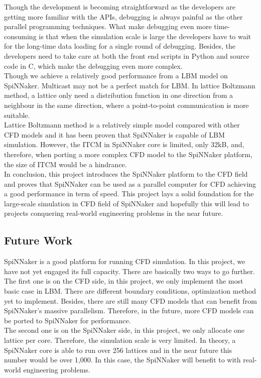 Though the development is becoming straightforward as the developers are getting more familiar with the APIs, debugging is always painful as the other parallel programming techniques. What make debugging even more time-consuming is that when the simulation scale is large the developers have to wait for the long-time data loading for a single round of debugging. Besides, the developers need to take care at both the front end scripts in Python and source code in C, which make the debugging even more complex. \\

Though we achieve a relatively good performance from a LBM model on SpiNNaker. Multicast may not be a perfect match for LBM. In lattice Boltzmann method, a lattice only need a distribution function in one direction from a neighbour in the same direction, where a point-to-point communication is more suitable.\\

Lattice Boltzmann method is a relatively simple model compared with other CFD models and it has been proven that SpiNNaker is capable of LBM simulation. However, the ITCM in SpiNNaker core is limited, only 32kB, and, therefore, when porting a more complex CFD model to the SpiNNaker platform, the size of ITCM would be a hindrance. \\

 
In conclusion, this project introduces the SpiNNaker platform to the CFD field and proves that SpiNNaker can be used as a parallel computer for CFD achieving a good performance in term of speed. This project lays a solid foundation for the large-scale simulation in CFD field of SpiNNaker and hopefully this will lead to projects conquering real-world engineering problems in the near future.


\subsection{Future Work} \label{sec:future_work}
SpiNNaker is a good platform for running CFD simulation. In this project, we have not yet engaged its full capacity. There are basically two ways to go further.\\

The first one is on the CFD side, in this project, we only implement the most basic case in LBM. There are different boundary conditions, optimization method yet to implement. Besides, there are still many CFD models that can benefit from SpiNNaker's massive parallelism. Therefore, in the future, more CFD models can be ported to SpiNNaker for performance. \\

The second one is on the SpiNNaker side, in this project, we only allocate one lattice per core. Therefore, the simulation scale is very limited. In theory, a SpiNNaker core is able to run over 256 lattices and in the near future this number would be over 1,000. In this case, the SpiNNaker will benefit to with real-world engineering problems.\\




